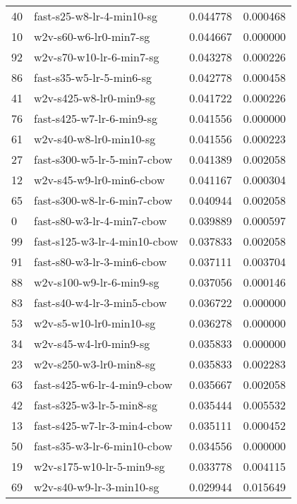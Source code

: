{\begin{tabular}{llrr}
40 &     fast-s25-w8-lr-4-min10-sg &  0.044778 &  0.000468 \\
10 &        w2v-s60-w6-lr0-min7-sg &  0.044667 &  0.000000 \\
92 &      w2v-s70-w10-lr-6-min7-sg &  0.043278 &  0.000226 \\
86 &      fast-s35-w5-lr-5-min6-sg &  0.042778 &  0.000458 \\
41 &       w2v-s425-w8-lr0-min9-sg &  0.041722 &  0.000226 \\
76 &     fast-s425-w7-lr-6-min9-sg &  0.041556 &  0.000000 \\
61 &       w2v-s40-w8-lr0-min10-sg &  0.041556 &  0.000223 \\
27 &   fast-s300-w5-lr-5-min7-cbow &  0.041389 &  0.002058 \\
12 &      w2v-s45-w9-lr0-min6-cbow &  0.041167 &  0.000304 \\
65 &   fast-s300-w8-lr-6-min7-cbow &  0.040944 &  0.002058 \\
0  &    fast-s80-w3-lr-4-min7-cbow &  0.039889 &  0.000597 \\
99 &  fast-s125-w3-lr-4-min10-cbow &  0.037833 &  0.002058 \\
91 &    fast-s80-w3-lr-3-min6-cbow &  0.037111 &  0.003704 \\
88 &      w2v-s100-w9-lr-6-min9-sg &  0.037056 &  0.000146 \\
83 &    fast-s40-w4-lr-3-min5-cbow &  0.036722 &  0.000000 \\
53 &       w2v-s5-w10-lr0-min10-sg &  0.036278 &  0.000000 \\
34 &        w2v-s45-w4-lr0-min9-sg &  0.035833 &  0.000000 \\
23 &       w2v-s250-w3-lr0-min8-sg &  0.035833 &  0.002283 \\
63 &   fast-s425-w6-lr-4-min9-cbow &  0.035667 &  0.002058 \\
42 &     fast-s325-w3-lr-5-min8-sg &  0.035444 &  0.005532 \\
13 &   fast-s425-w7-lr-3-min4-cbow &  0.035111 &  0.000452 \\
50 &   fast-s35-w3-lr-6-min10-cbow &  0.034556 &  0.000000 \\
19 &     w2v-s175-w10-lr-5-min9-sg &  0.033778 &  0.004115 \\
69 &      w2v-s40-w9-lr-3-min10-sg &  0.029944 &  0.015649 \\
\bottomrule
\end{tabular}
}
